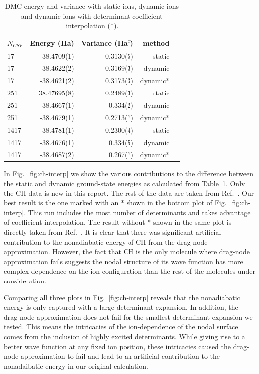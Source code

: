 \documentclass[aip,jcp,numerical,reprint]{revtex4-1}
\begin{document}
\begin{table}[h]
\begin{tabular}{lrrrl}
\hline\hline
$N_{CSF}$ & Energy (Ha) & Variance (Ha$^2$) & method \\
\hline
17   & -38.4709(1) &  0.3130(5) &    static \\
17   & -38.4622(2) &  0.3169(3) &   dynamic \\
17   & -38.4621(2) &  0.3173(3) &  dynamic* \\
251  & -38.47695(8)&  0.2489(3) &    static \\
251  & -38.4667(1) &  0.334(2)  &   dynamic \\
251  & -38.4679(1) &  0.2713(7) &  dynamic* \\
1417 & -38.4781(1) &  0.2300(4) &    static \\
1417 & -38.4676(1) &  0.334(5)  &   dynamic \\
1417 & -38.4687(2) &  0.267(7)  &  dynamic* \\
\hline\hline
\end{tabular}
\caption{DMC energy and variance with static ions, dynamic ions and dynamic ions with determinant coefficient interpolation (*).\label{tab:energy}}
\end{table}

In Fig.~\ref{fig:ch-interp} we show the various contributions to the difference between the static and dynamic ground-state energies as calculated from Table~\ref{tab:energy}. Only the CH data is new in this report. The rest of the data are taken from Ref.~\cite{Yang2015}. Our best result is the one marked with an * shown in the bottom plot of Fig.~\ref{fig:ch-interp}. This run includes the most number of determinants and takes advantage of coefficient interpolation. The result without * shown in the same plot is directly taken from Ref.~\cite{Yang2015}. It is clear that there was significant artificial contribution to the nonadiabatic energy of CH from the drag-node approximation. However, the fact that CH is the only molecule where drag-node approximation fails suggests the nodal structure of its wave function has more complex dependence on the ion configuration than the rest of the molecules under consideration.

Comparing all three plots in Fig.~\ref{fig:ch-interp} reveals that the nonadiabatic energy is only captured with a large determinant expansion. In addition, the drag-node approximation does not fail for the smallest determinant expansion we tested. This means the intricacies of the ion-dependence of the nodal surface comes from the inclusion of highly excited determinants. While giving rise to a better wave function at any fixed ion position, these intricacies caused the drag-node approximation to fail and lead to an artificial contribution to the nonadaibatic energy in our original calculation.
\end{document}
